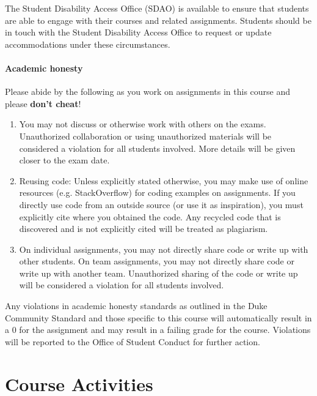 \documentclass[11pt]{article}
\begin{document}
The Student Disability Access Office (SDAO) is available to ensure that students are able to engage with their courses and related assignments. Students should be in touch with the Student Disability Access Office to request or update accommodations under these circumstances. 

\paragraph{Academic honesty} 

Please abide by the following as you work on assignments in this course and please \textbf{don't cheat}! 

\begin{enumerate}
\item You may not discuss or otherwise work with others on the exams. Unauthorized collaboration or using unauthorized materials will be considered a violation for all students involved. More details will be given closer to the exam date.
\item Reusing code: Unless explicitly stated otherwise, you may make use of online resources (e.g. StackOverflow) for coding examples on assignments. If you directly use code from an outside source (or use it as inspiration), you must explicitly cite where you obtained the code. Any recycled code that is discovered and is not explicitly cited will be treated as plagiarism.
\item On individual assignments, you may not directly share code or write up with other students. On team assignments, you may not directly share code or write up with another team. Unauthorized sharing of the code or write up will be considered a violation for all students involved.
\end{enumerate}

Any violations in academic honesty standards as outlined in the Duke Community Standard and those specific to this course will automatically result in a 0 for the assignment and may result in a failing grade for the course. Violations will be reported to the Office of Student Conduct for further action.















\section{Course Activities}
\end{document}
